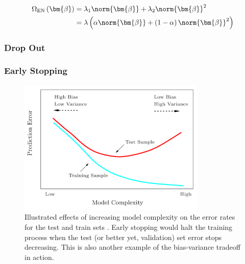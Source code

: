 \begin{equation} \label{eq:elastic_net}
\begin{split}
\Omega_{\text{EN}}\left(\bm{\beta}\right) &= \lambda_{1} \norm{\bm{\beta}} + \lambda_{2} \norm{\bm{\beta}}^{2}\\
&= \lambda \left( \alpha\norm{\bm{\beta}} + \left(1-\alpha\right)\norm{\bm{\beta}}^{2} \right)
\end{split}
\end{equation}


\subsubsection{Drop Out}
\label{additional:ml:general:reg:Drop}

\subsubsection{Early Stopping}
\label{additional:ml:general:reg:early_stopping}

\begin{figure}[H]
\centering
\includegraphics[width=0.8\textwidth]{figures/ml/test_train_err_curves.png}
\caption{
Illustrated effects of increasing model complexity on the error rates for the test and train sets \cite{HastieTF09}.
Early stopping would halt the training process when the test (or better yet, validation) set error stops decreasing.
This is also another example of the bias-variance tradeoff in action.
}
\label{fig:additional:ml:general:early_stopping}
\end{figure}
